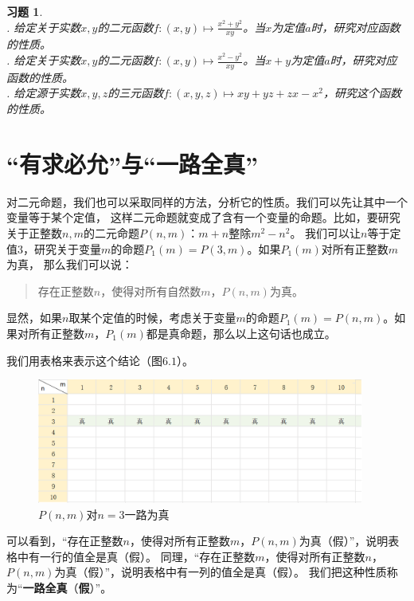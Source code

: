 \documentclass[12pt,UTF8]{ctexbook}
\newtheorem{xt}{习题}[section]
\begin{document}
\begin{xt}
    \mbox{} \\
    . 给定关于实数$x, y$的二元函数$f: (x, y) \mapsto \frac{x^2 + y^2}{xy}$。当$x$为定值$a$时，研究对应函数的性质。\\
    . 给定关于实数$x, y$的二元函数$f: (x, y) \mapsto \frac{x^2 - y^2}{xy}$。当$x+y$为定值$a$时，研究对应函数的性质。\\
    . 给定源于实数$x,y,z$的三元函数$f:(x,y,z) \mapsto xy + yz + zx - x^2$，研究这个函数的性质。
\end{xt}


\section{“有求必允”与“一路全真”}

对二元命题，我们也可以采取同样的方法，分析它的性质。我们可以先让其中一个变量等于某个定值，
这样二元命题就变成了含有一个变量的命题。比如，要研究关于正整数$n,m$的二元命题$P(n,m)$：$m + n$整除$m^2 - n^2$。
我们可以让$n$等于定值$3$，研究关于变量$m$的命题$P_1 (m) = P(3,m)$。如果$P_1(m)$对所有正整数$m$为真，
那么我们可以说：
\begin{quotation}
    存在正整数$n$，使得对所有自然数$m$，$P(n,m)$为真。
\end{quotation}
显然，如果$n$取某个定值的时候，考虑关于变量$m$的命题$P_1 (m) = P(n,m)$。如果对所有正整数$m$，$P_1(m)$都是真命题，那么以上这句话也成立。

我们用表格来表示这个结论（图$6.1$）。

\begin{figure}[h] %
    \vspace{4pt}
    \centering
    \includegraphics[width=0.96\textwidth]{tu/多元映射10.png}
    \caption{$P(n,m)$对$n=3$一路为真}
\end{figure}

可以看到，“存在正整数$n$，使得对所有正整数$m$，$P(n,m)$为真（假）”，说明表格中有一行的值全是真（假）。
同理，“存在正整数$m$，使得对所有正整数$n$，$P(n,m)$为真（假）”，说明表格中有一列的值全是真（假）。
我们把这种性质称为“\textbf{一路全真}（\textbf{假}）”。
\end{document}
